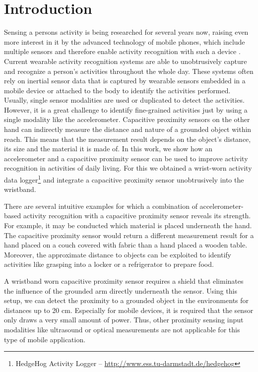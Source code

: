 \documentclass[runningheads,a4paper]{llncs}
\begin{document}
\section{Introduction}

Sensing a persons activity is being researched for several years now, raising even more interest in it by the advanced technology of mobile phones, which include multiple sensors and therefore enable activity recognition with such a device \cite{brezmes2009activity}. Current wearable activity recognition systems are able to unobtrusively capture and recognize a person's activities throughout the whole day. These systems often rely on inertial sensor data that is captured by wearable sensors embedded in a mobile device \cite{brezmes2009activity} or attached to the body \cite{Ravi2005} to identify the activities performed. Usually, single sensor modalities are used or duplicated to detect the activities. However, it is a great challenge to identify fine-grained activities just by using a single modality like the accelerometer. Capacitive proximity sensors on the other hand can indirectly measure the distance and nature of a grounded object within reach. This means that the measurement result depends on the object's distance, its size and the material it is made of. In this work, we show how an accelerometer and a capacitive proximity sensor can be used to improve activity recognition in activities of daily living. For this we obtained a wrist-worn activity data logger\footnote{HedgeHog Activity Logger -- \url{http://www.ess.tu-darmstadt.de/hedgehog}} and integrate a capacitive proximity sensor unobtrusively into the wristband.

There are several intuitive examples for which a combination of accelerometer-based activity recognition with a capacitive proximity sensor reveals its strength. For example, it may be conducted which material is placed underneath the hand. The capacitive proximity sensor would return a different measurement result for a hand placed on a couch covered with fabric than a hand placed a wooden table. Moreover, the approximate distance to objects can be exploited to identify activities like grasping into a locker or a refrigerator to prepare food.

A wristband worn capacitive proximity sensor requires a shield that eliminates the influence of the grounded arm directly underneath the sensor. Using this setup, we can detect the proximity to a grounded object in the environments for distances up to 20 cm. Especially for mobile devices, it is required that the sensor only draws a very small amount of power. Thus, other proximity sensing input modalities like ultrasound or optical measurements are not applicable for this type of mobile application.
\end{document}
